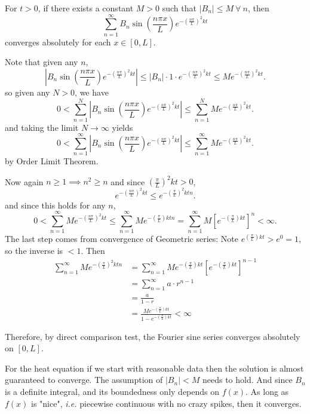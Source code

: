 \documentclass[class=article,crop=false]{standalone}
\begin{document}
\begin{thm}
For $ t>0$, if there exists a constant  $ M>0$  such that $ |B_n|\leq M \ \forall \ n$, then
\[
\sum_{ n= 1}^{\infty} B_n \sin \left( \frac{ n\pi x}{ L} \right) e^{-( \frac{ n\pi}{L} )^2 kt} 
\]
converges absolutely for each $ x \in [0,L]$.
\end{thm}
\begin{prf}
Note that given any $ n$,
 \[
\left| B_n \sin \left( \frac{ n\pi x}{ L} \right) e^{-( \frac{ n\pi}{L} )^2 kt}  \right| \leq |B_n| \cdot  1 \cdot e^{-( \frac{ n\pi}{L} )^2 kt} \leq M e^{-( \frac{ n\pi}{L} )^2 kt} 
.\]
so given any $ N>0$, we have
 \[
	 0< \sum_{ n= 1}^{ N} \left| B_n \sin \left( \frac{ n\pi x}{ L} \right) e^{-( \frac{ n\pi}{L} )^2 kt}  \right| \leq \sum_{ n= 1}^{ N} M e^{-( \frac{ n\pi}{L} )^2 kt} 
.\] 
and taking the limit $ N \to \infty$ yields
\[
0 < \sum_{ n= 1}^{\infty} \left| B_n \sin \left( \frac{ n\pi x}{ L} \right) e^{-( \frac{ n\pi}{L} )^2 kt}  \right| \leq \sum_{ n= 1}^{\infty} M e^{-( \frac{ n\pi}{L} )^2 kt} 
.\] 
by Order Limit Theorem.

Now again $ n \geq 1 \implies n^2 \geq n$ and since $ \left( \frac{\pi}{L} \right)^2 kt >0 $,
\[
e^{-( \frac{ n\pi}{L} )^2 kt} \leq e^{-( \frac{ \pi}{L} )^2 ktn} 
.\] 
and since this holds for any $ n$, 
 \[
	 0< \sum_{ n= 1}^{\infty} M e^{-( \frac{ n\pi}{L} )^2 kt} \leq \sum_{ n= 1}^{\infty} M e^{-( \frac{ \pi}{L} ) ktn} =  \sum_{ n= 1}^{\infty} M \left[{e^{-( \frac{ \pi}{L} ) kt}}\right]^{n} < \infty 
.\] 
The last step comes from convergence of Geometric series:
Note $ e^{(\frac{\pi}{L})kt} > e^{0} = 1$, so the inverse is $ <1$.
Then
\begin{align*}
	\sum_{ n= 1}^{\infty} M e^{-( \frac{ \pi}{L} )^2 ktn} &= \sum_{ n= 1}^{\infty} M e^{-( \frac{ \pi}{L} ) kt} \left[e^{-( \frac{ \pi}{L} ) kt}\right]^{n-1}  \\
	&= \sum_{ n= 1}^{\infty} a \cdot  r^{n-1} \\
	&= \frac{a}{1-r} \\
	&= \frac{M e^{-( \frac{ \pi}{L} ) kt} }{1- e^{-( \frac{ \pi}{L} ) kt} } < \infty
\end{align*}

Therefore, by direct comparison test, the Fourier sine series converges absolutely on $ [0,L]$.
\end{prf}

\begin{note}[]
	For the heat equation if we start with reasonable data then the solution is almost guaranteed to converge. The assumption of $ |B_n| < M$ needs to hold. And since $ B_n$ is a definite integral, and its boundedness only depends on $ f(x)$. As long as  $ f(x)$ is "nice",  \emph{i.e.} piecewise continuous with no crazy spikes, then it converges.
\end{note}
\end{document}
